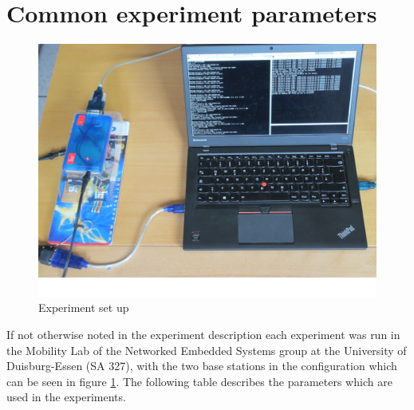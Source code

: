 \newpage

\section{Common experiment parameters}
\label{sec:commonPara}
\begin{figure}[H]
	\centering
	\includegraphics[scale=.75]{content/images/expSetup.JPG}
	\caption{Experiment set up}\label{fig:expSetup}
\end{figure}

If not otherwise noted in the experiment description each experiment was run in the Mobility Lab of the Networked Embedded Systems group at the University of Duisburg-Essen (SA 327), with the two base stations in the configuration which can be seen in figure \ref{fig:expSetup}. The following table describes the parameters which are used in the experiments.

